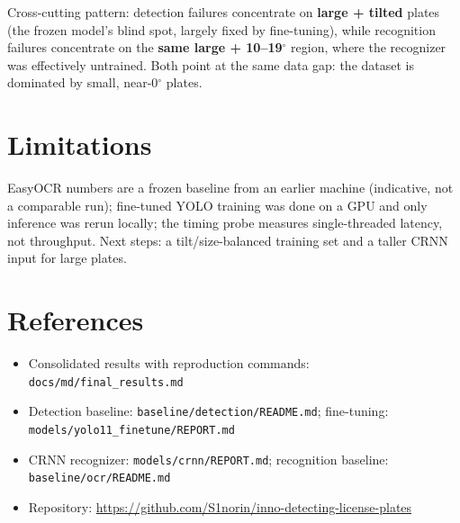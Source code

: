 \documentclass[11pt]{article}
\begin{document}
Cross-cutting pattern: detection failures concentrate on \textbf{large +
tilted} plates (the frozen model's blind spot, largely fixed by
fine-tuning), while recognition failures concentrate on the \textbf{same
large + 10--19$^{\circ}$} region, where the recognizer was effectively
untrained. Both point at the same data gap: the dataset is dominated by
small, near-0$^{\circ}$ plates.

\section*{Limitations}

EasyOCR numbers are a frozen baseline from an earlier machine (indicative,
not a comparable run); fine-tuned YOLO training was done on a GPU and only
inference was rerun locally; the timing probe measures single-threaded
latency, not throughput. Next steps: a tilt/size-balanced training set and
a taller CRNN input for large plates.

\section*{References}

\begin{itemize}
\item Consolidated results with reproduction commands:
  \texttt{docs/md/final\_results.md}
\item Detection baseline: \texttt{baseline/detection/README.md};
  fine-tuning: \texttt{models/yolo11\_finetune/REPORT.md}
\item CRNN recognizer: \texttt{models/crnn/REPORT.md};
  recognition baseline: \texttt{baseline/ocr/README.md}
\item Repository: \url{https://github.com/S1norin/inno-detecting-license-plates}
\end{itemize}
\end{document}
